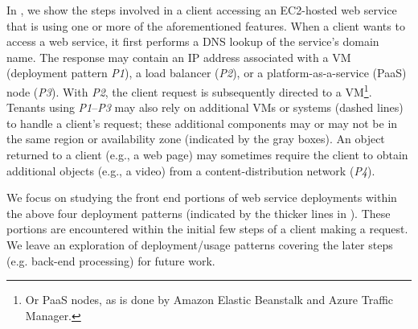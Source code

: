 In , we show the steps involved in a client
accessing an EC2-hosted web service that is using one or more of the
aforementioned features. When a client wants to access a web service,
it first performs a DNS lookup of the service's domain name.  The
response may contain an IP address associated with a VM (deployment
pattern {\em P1}), a load balancer ({\em P2}), or a
platform-as-a-service (PaaS) node ({\em P3}).
With {\em P2}, the client request is subsequently directed to a
VM\footnote{Or PaaS
  nodes, as is done by Amazon Elastic Beanstalk and Azure Traffic
  Manager.}. Tenants using {\em P1}--{\em P3} may also rely on
additional VMs or systems (dashed lines) to handle a
client's request; these additional components may or may not be in the
same region or availability zone (indicated by the gray boxes). An
object returned to a client (e.g., a web page) may sometimes require
the client to obtain additional objects (e.g., a video) from a
content-distribution network ({\em P4}).

We focus on studying the front end portions of web
service deployments within the above four deployment patterns (indicated by 
the thicker lines in ). These
portions are encountered within the initial few steps of a client
making a request. We leave an exploration of deployment/usage patterns
covering the later steps (e.g. back-end processing) for future work.




